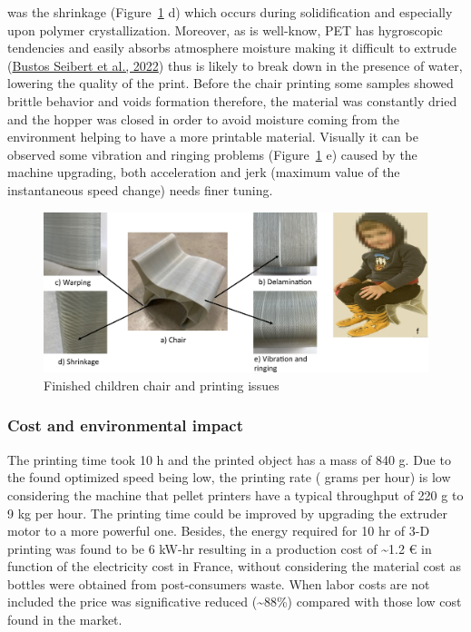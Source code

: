 \documentclass[
  12pt,
]{article}
\begin{document}
was the shrinkage (Figure~\ref{fig-child} d) which occurs during
solidification and especially upon polymer crystallization. Moreover, as
is well-know, PET has hygroscopic tendencies and easily absorbs
atmosphere moisture making it difficult to extrude
(\protect\hyperlink{ref-bustosseibert2022}{Bustos Seibert et al., 2022})
thus is likely to break down in the presence of water, lowering the
quality of the print. Before the chair printing some samples showed
brittle behavior and voids formation therefore, the material was
constantly dried and the hopper was closed in order to avoid moisture
coming from the environment helping to have a more printable material.
Visually it can be observed some vibration and ringing problems
(Figure~\ref{fig-child} e) caused by the machine upgrading, both
acceleration and jerk (maximum value of the instantaneous speed change)
needs finer tuning.

\begin{figure}

{\centering \includegraphics{figures/Figure6.png}

}

\caption{\label{fig-child}Finished children chair and printing issues}

\end{figure}

\hypertarget{cost-and-environmental-impact}{%
\subsubsection{Cost and environmental
impact}\label{cost-and-environmental-impact}}

The printing time took 10 h and the printed object has a mass of 840 g.
Due to the found optimized speed being low, the printing rate ( grams
per hour) is low considering the machine that pellet printers have a
typical throughput of 220 g to 9 kg per hour. The printing time could be
improved by upgrading the extruder motor to a more powerful one.
Besides, the energy required for 10 hr of 3-D printing was found to be 6
kW-hr resulting in a production cost of \textasciitilde1.2 € in function
of the electricity cost in France, without considering the material cost
as bottles were obtained from post-consumers waste. When labor costs are
not included the price was significative reduced (\textasciitilde88\%)
compared with those low cost found in the market.
\end{document}
